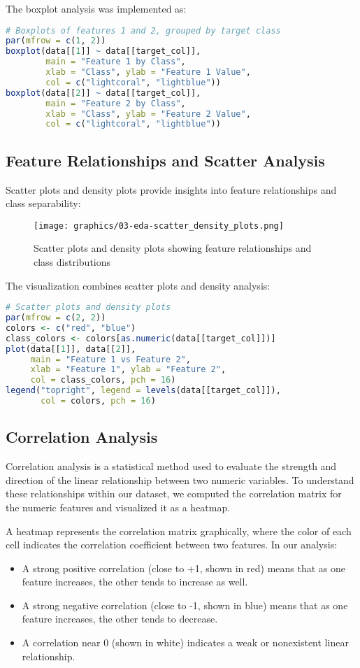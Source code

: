 The boxplot analysis was implemented as:

\begin{lstlisting}[language=R]
# Boxplots of features 1 and 2, grouped by target class
par(mfrow = c(1, 2))
boxplot(data[[1]] ~ data[[target_col]], 
        main = "Feature 1 by Class",
        xlab = "Class", ylab = "Feature 1 Value",
        col = c("lightcoral", "lightblue"))
boxplot(data[[2]] ~ data[[target_col]], 
        main = "Feature 2 by Class",
        xlab = "Class", ylab = "Feature 2 Value",
        col = c("lightcoral", "lightblue"))
\end{lstlisting}

\subsection{Feature Relationships and Scatter Analysis}
Scatter plots and density plots provide insights into feature relationships and class separability:

\begin{figure}[H]
\centering
\texttt{[image: graphics/03-eda-scatter\_density\_plots.png]}
\caption{Scatter plots and density plots showing feature relationships and class distributions}
\label{fig:scatter-density}
\end{figure}

The visualization combines scatter plots and density analysis:

\begin{lstlisting}[language=R]
# Scatter plots and density plots
par(mfrow = c(2, 2))
colors <- c("red", "blue")
class_colors <- colors[as.numeric(data[[target_col]])]
plot(data[[1]], data[[2]], 
     main = "Feature 1 vs Feature 2", 
     xlab = "Feature 1", ylab = "Feature 2", 
     col = class_colors, pch = 16)
legend("topright", legend = levels(data[[target_col]]), 
       col = colors, pch = 16)
\end{lstlisting}

\subsection{Correlation Analysis}
Correlation analysis is a statistical method used to evaluate the strength and direction of the linear relationship between two numeric variables. To understand these relationships within our dataset, we computed the correlation matrix for the numeric features and visualized it as a heatmap.

A heatmap represents the correlation matrix graphically, where the color of each cell indicates the correlation coefficient between two features. In our analysis:
\begin{itemize}
    \item A strong positive correlation (close to +1, shown in red) means that as one feature increases, the other tends to increase as well.
    \item A strong negative correlation (close to -1, shown in blue) means that as one feature increases, the other tends to decrease.
    \item A correlation near 0 (shown in white) indicates a weak or nonexistent linear relationship.
\end{itemize}

